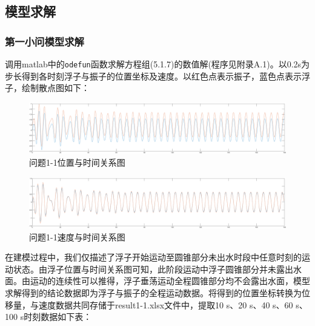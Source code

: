 \documentclass{article}
\numberwithin{equation}{subsection}
\begin{document}
\subsection{模型求解}

\subsubsection{第一小问模型求解}
调用matlab中的\verb|odefun|函数求解方程组(5.1.7)的数值解(程序见附录A.1)。以0.2s为步长得到各时刻浮子与振子的位置坐标及速度。以红色点表示振子，蓝色点表示浮子，绘制散点图如下：

\begin{figure}[H]
    \centering
    \includegraphics[scale=0.3]{问题1-1位移.png}
    \caption{问题1-1位置与时间关系图}
\end{figure}
\begin{figure}[H]
    \centering
    \includegraphics[scale=0.3]{问题1-1速度.png}
    \caption{问题1-1速度与时间关系图}
\end{figure}

在建模过程中，我们仅描述了浮子开始运动至圆锥部分未出水时段中任意时刻的运动状态。由浮子位置与时间关系图可知，此阶段运动中浮子圆锥部分并未露出水面。由运动的连续性可以推得，浮子垂荡运动全程圆锥部分均不会露出水面，模型求解得到的结论数据即为浮子与振子的全程运动数据。将得到的位置坐标转换为位移量，与速度数据共同存储于result1-1.xlsx文件中，提取10 s、20 s、40 s、60 s、100 s时刻数据如下表：
\end{document}
